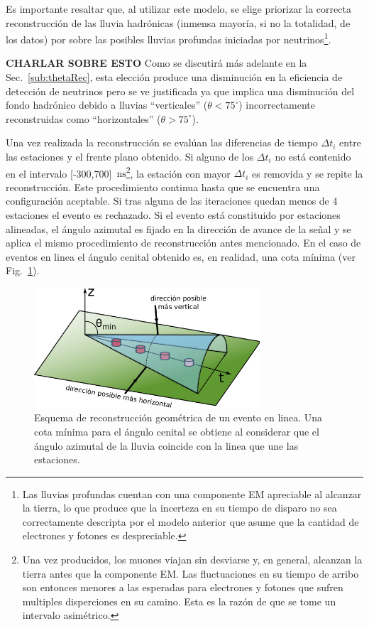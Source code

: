 	Es importante resaltar que, al utilizar este modelo, se elige priorizar la correcta reconstrucción de las lluvia hadrónicas (inmensa mayoría, si no la totalidad, de los datos) por sobre las posibles lluvias profundas iniciadas por neutrinos\footnote{Las lluvias profundas cuentan con una componente EM apreciable al alcanzar la tierra, lo que produce que la incerteza en su tiempo de disparo no sea correctamente descripta por el modelo anterior que asume que la cantidad de electrones y fotones es despreciable.}. 
	
	\textbf{CHARLAR SOBRE ESTO}
	Como se discutirá más adelante en la Sec.~\ref{sub:thetaRec}, esta elección produce una disminución en la eficiencia de detección de neutrinos pero se ve justificada ya que implica una disminución del fondo hadrónico debido a lluvias ``verticales'' ($\theta<75^\circ$) incorrectamente reconstruidas como ``horizontales'' ($\theta>75^\circ$).

	Una vez realizada la reconstrucción se evalúan las diferencias de tiempo $\Delta t_i$ entre las estaciones y el frente plano obtenido. Si alguno de los $\Delta t_i$ no está contenido en el intervalo [-300,700]~$\mbox{ns}$\footnote{
	Una vez producidos, los muones viajan sin desviarse y, en general, alcanzan la tierra antes que la componente EM. Las fluctuaciones en su tiempo de arribo son entonces menores a las esperadas para electrones y fotones que sufren multiples disperciones en su camino. Esta es la razón de que se tome un intervalo asimétrico.
	},
	la estación con mayor $\Delta t_i$ es removida y se repite la reconstrucción. Este procedimiento continua hasta que se encuentra una configuración aceptable. Si tras alguna de las iteraciones quedan menos de 4 estaciones el evento es rechazado.
	Si el evento está constituido por estaciones alineadas, el ángulo azimutal es fijado en la dirección de avance de la señal y se aplica el mismo procedimiento de reconstrucción antes mencionado. En el caso de eventos en linea el ángulo cenital obtenido es, en realidad, una cota mínima (ver Fig.~\ref{fig:conoLineEvent}).
	\begin{figure}[ht]
	\begin{center}
	\includegraphics[width=0.75\textwidth]{fig/seleccionAuger/conoLineEvent.pdf}
	\caption{Esquema de reconstrucción geométrica de un evento en linea. Una cota mínima para el ángulo cenital se obtiene al considerar que el ángulo azimutal de la lluvia coincide con la linea que une las estaciones.}
	\label{fig:conoLineEvent}
	\end{center}
	\end{figure} 
	

